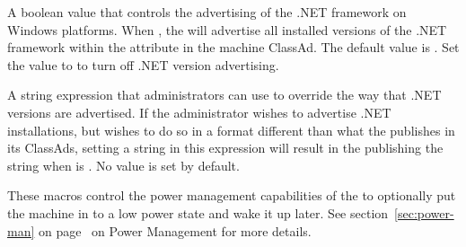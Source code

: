 \begin{description}
\label{param:StartdPublishDotnet}
\item[\Macro{STARTD\_PUBLISH\_DOTNET}]
  A boolean value that controls the advertising of the .NET framework 
  on Windows platforms.
  When , the  will advertise all installed versions 
  of the .NET framework within the  attribute 
  in the  machine ClassAd.
  The default value is .
  Set the value to  to turn off .NET version advertising.
  
\label{param:DotNetVersions}
\item[\Macro{DOT\_NET\_VERSIONS}]
  A string expression that administrators can use to override the way that
  .NET versions are advertised.  
  If the administrator wishes to advertise .NET installations,
  but wishes to do so in a format different than what the 
  publishes in its ClassAds,
  setting a string in this expression will result in the 
  publishing the string when  is .
  No value is set by default.
\end{description}

These macros control the power management capabilities of the 
 to optionally put the machine in to a low power state
and wake it up later.
See section~\ref{sec:power-man} on page~\pageref{sec:power-man} on
Power Management for more details.

